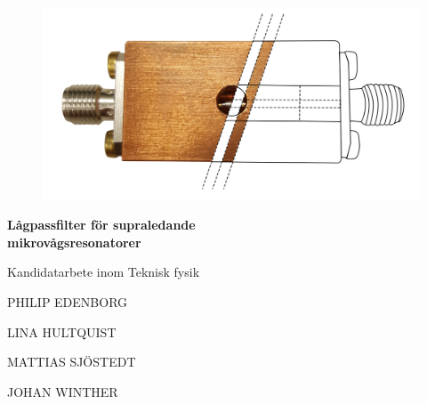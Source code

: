 \documentclass[../../main.tex]{subfiles}
\begin{document}
\begin{titlepage}
			
\addtolength{\voffset}{2cm}

\begin{figure}[H]
\centering
\vspace{2cm}	%
\includegraphics[width=0.8\linewidth]{figure/auxiliary/front.png}
\end{figure}

\renewcommand{\familydefault}{\sfdefault} \normalfont %
\textbf{{\Huge Lågpassfilter för supraledande \\mikrovågsresonatorer}}

{\Large \undertitel}

Kandidatarbete inom Teknisk fysik
\setlength{\parskip}{0.5cm}

{\Large PHILIP EDENBORG

\setlength{\parskip}{0em}
LINA HULTQUIST

MATTIAS SJÖSTEDT

JOHAN WINTHER

}

\setlength{\parskip}{1cm}

\department\\
\textsc{\university} \\
\adress

\renewcommand{\familydefault}{\rmdefault} \normalfont %
\end{titlepage}


\newpage\null\thispagestyle{empty}\newpage
\restoregeometry

\end{document}
